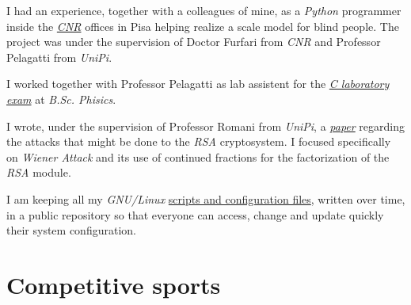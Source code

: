 \documentclass[10pt]{article} %
\begin{document}
I had an experience, together with a colleagues of mine, as a \textit{Python} programmer inside the \href{https://www.isti.cnr.it/en/}{\textit{CNR}} offices in Pisa helping realize a scale model for blind people. The project was under the supervision of Doctor Furfari from \textit{CNR} and Professor Pelagatti from \textit{UniPi}.

\medskip
I worked together with Professor Pelagatti as lab assistent for the \href{http://didawiki.di.unipi.it/doku.php/fisica/informatica/201617/start}{\textit{C laboratory exam}} at \textit{B.Sc. Phisics}.

\medskip
I wrote, under the supervision of Professor Romani from \textit{UniPi}, a \href{https://www.geoteo.net/attack.html}{\textit{paper}} regarding the attacks that might be done to the \textit{RSA} cryptosystem. I focused specifically on \textit{Wiener Attack} and its use of continued fractions for the factorization of the \textit{RSA} module.

\medskip
I am keeping all my \textit{GNU/Linux} \href{https://www.geoteo.net/config.html}{scripts and configuration files}, written over time, in a public repository so that everyone can access, change and update quickly their system configuration.



\vspace{15pt}
\section{Competitive sports}
\end{document}
